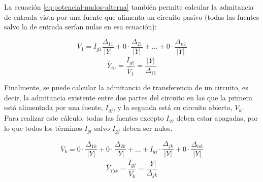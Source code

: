 La ecuación \ref{eq:potencial-nudos-alterna} también permite calcular la admitancia de entrada vista por una fuente que alimenta un circuito pasivo (todas las fuentes salvo la de entrada serían nulas en esa ecuación):

\begin{equation}
  \overline{V}_1 = \overline{I}_{g1} \frac{\Delta_{11}}{|Y|} + 0 \cdot \frac{\Delta_{21}}{|Y|} + \dots + 0 \cdot \frac{\Delta_{n1}}{|Y|}
\end{equation}
\begin{equation}
  \overline{Y}_{in} = \frac{\overline{I}_{g1}}{\overline{V}_1}=  \frac{|Y|}{\Delta_{11}}
\end{equation}

Finalmente, se puede calcular la admitancia de transferencia de un circuito, es decir, la admitancia existente entre dos partes del circuito en las que la primera está alimentada por una fuente, $I_{gj}$, y la segunda está en circuito abierto, $V_k$. Para realizar este cálculo, todas las fuentes excepto $I_{gj}$ deben estar apagadas, por lo que todos los términos
$I_{gi}$ salvo $I_{gj}$ deben ser nulos.

\begin{equation}
  \overline{V}_k = 0 \cdot \frac{\Delta_{1k}}{|Y|} + 0 \cdot \frac{\Delta_{2k}}{|Y|} + \dots + I_{gj} \cdot \frac{\Delta_{jk}}{|Y|} + 0 \cdot \frac{\Delta_{nk}}{|Y|}
\end{equation}
\begin{equation}
  \label{eq:admitancia-transferencia}
  \overline{Y}_{Tjk} = \frac{\overline{I}_{gj}}{\overline{V}_k}=  \frac{|Y|}{\Delta_{jk}}
\end{equation}


	


